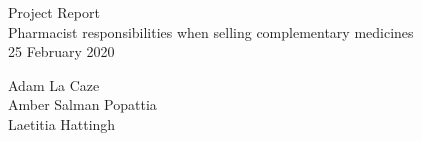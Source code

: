 % 
\begin{titlepage}
\raggedleft %
\vspace*{\baselineskip} %

{\Large Project Report}\\[0.167\textheight]


{\Huge Pharmacist responsibilities when selling complementary medicines} \\[\baselineskip] %


{\Large 25 February 2020}

\vfill %

{\large Adam La Caze \\[3pt] Amber Salman Popattia \\[5pt] Laetitia Hattingh} 

\bigskip

\raggedright


\vspace*{3\baselineskip} %
\thispagestyle{empty}
\end{titlepage}
% 